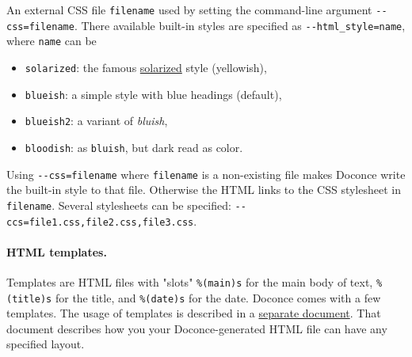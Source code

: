 \documentclass[%
oneside,                 %
final,                   %
10pt]{article}
\begin{document}
{{An external CSS file {\fontsize{10pt}{10pt}\Verb!filename!} used by setting the command-line
argument {\fontsize{10pt}{10pt}\Verb!--css=filename!}. There available built-in styles are
specified as {\fontsize{10pt}{10pt}\Verb!--html_style=name!}, where {\fontsize{10pt}{10pt}\Verb!name!} can be

\begin{itemize}
 \item {\fontsize{10pt}{10pt}\Verb!solarized!}: the famous \href{{http://ethanschoonover.com/solarized}}{solarized}
   style (yellowish),

 \item {\fontsize{10pt}{10pt}\Verb!blueish!}: a simple style with blue headings (default),

 \item {\fontsize{10pt}{10pt}\Verb!blueish2!}: a variant of \emph{bluish},

 \item {\fontsize{10pt}{10pt}\Verb!bloodish!}: as {\fontsize{10pt}{10pt}\Verb!bluish!}, but dark read as color.
\end{itemize}

\noindent
Using {\fontsize{10pt}{10pt}\Verb!--css=filename!} where {\fontsize{10pt}{10pt}\Verb!filename!} is a non-existing file makes
Doconce write the built-in style to that file. Otherwise the HTML
links to the CSS stylesheet in {\fontsize{10pt}{10pt}\Verb!filename!}. Several stylesheets can
be specified: {\fontsize{10pt}{10pt}\Verb!--ccs=file1.css,file2.css,file3.css!}.

\paragraph{HTML templates.}
Templates are HTML files with "slots" {\fontsize{10pt}{10pt}\Verb!%
of text, {\fontsize{10pt}{10pt}\Verb!%
Doconce comes with a few templates. The usage of templates is
described in a \href{{https://doconce.googlecode.com/hg/doc/design/wrapper_tech.html}}{separate document}. That document describes how you your Doconce-generated
HTML file can have any specified layout.

}}
\end{document}
